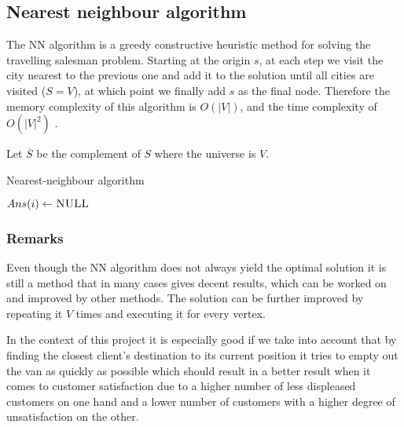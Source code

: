 \subsection{Nearest neighbour algorithm} \label{algorithm-tsp-nn}
The \acrfull*{NN} algorithm is a \gls{greedy} \gls{constructive} heuristic method for solving the travelling salesman problem.
Starting at the origin $s$, at each step we visit the city nearest to the previous one and add it to the solution until all cities are visited ($S = V$), at which point we finally add $s$ as the final node.
Therefore the memory complexity of this algorithm is $O(|V|)$, and the time complexity of $O(|V|^{2})$ \cite{reinelt}.\par
Let $\overline{S}$ be the complement of $S$ where the universe is $V$.
\begin{algorithm}[h]
    \caption{Nearest-neighbour algorithm}
    \label{alg:nearest neighbour}
    \begin{algorithmic}[1]
             {$Ans(i) \gets \textsc{NULL}$}
            \EndFor
            \EndFor
            \State {}
        \EndFunction
    \end{algorithmic}
\end{algorithm}
\subsubsection{Remarks}
Even though the \acrlong*{NN} algorithm does not always yield the optimal solution it is still a method that in many cases gives decent results, which can be worked on and improved by other methods.
The solution can be further improved by repeating it $V$ times and executing it for every vertex.\par
In the context of this project it is especially good if we take into account that by finding the closest client's destination to its current position it tries to empty out the van as quickly as possible
which should result in a better result when it comes to customer satisfaction due to a higher number of less displeased customers on one hand and a lower number of customers with a higher degree of unsatisfaction on the other.
